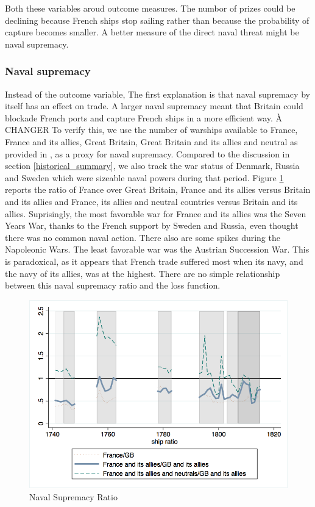 \documentclass[12pt,a4paper,notitlepage,english]{article}
\begin{document}
Both these variables aroud outcome measures. 
The numbor of prizes could be declining because French ships stop sailing rather than because the probability of capture becomes smaller. A better measure of the direct naval threat might be naval supremacy.


\subsubsection{Naval supremacy}
Instead of the outcome variable, The first explanation is that naval supremacy by itself has an effect on trade.
A larger naval supremacy meant that Britain could blockade French ports and capture French ships in a more efficient way.
À CHANGER
To verify this, we use the number of warships available to France, France and its allies, Great Britain, Great Britain and its allies and neutral as provided in \cite{Modelski1988}, as a proxy for naval supremacy.
Compared to the discussion in section \ref{historical_summary}, we also track the war status of Denmark, Russia and Sweden which were sizeable naval powers during that period.
Figure \ref{naval_supremacy_ratios} reports the ratio of France over Great Britain, France and its allies versus Britain and its allies and France, its allies and neutral countries versus Britain and its allies.
Suprisingly, the most favorable war for France and its allies was the Seven Years War, thanks to the French support by Sweden and Russia, even thought there was no common naval action.
There also are some spikes during the Napoleonic Wars.
The least favorable war was the Austrian Succession War. 
This is paradoxical, as it appears that French trade suffered most when its navy, and the navy of its allies, was at the highest.
There are no simple relationship between this naval supremacy ratio and the loss function. 
\begin{center}
\begin{figure}[H]
\caption{Naval Supremacy Ratio}
\label{naval_supremacy_ratios}
\centering
\includegraphics[scale=.51]{naval_supremacy_ratios.png}
\end{figure}
\end{center}
\end{document}
